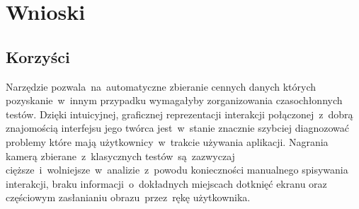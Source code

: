 \section{Wnioski}

\subsection{Korzyści} 
Narzędzie pozwala~na~automatyczne zbieranie cennych danych których pozyskanie~w~innym przypadku wymagałyby zorganizowania czasochłonnych testów. Dzięki intuicyjnej, graficznej reprezentacji interakcji połączonej~z~dobrą znajomością interfejsu jego twórca jest~w~stanie znacznie szybciej diagnozować problemy które mają użytkownicy~w~trakcie używania aplikacji. Nagrania kamerą zbierane~z~klasycznych testów~są~zazwyczaj cięższe~i~wolniejsze~w~analizie~z~powodu konieczności manualnego spisywania interakcji, braku informacji~o~dokładnych miejscach dotknięć ekranu oraz częściowym zasłanianiu obrazu~przez~rękę użytkownika. 
